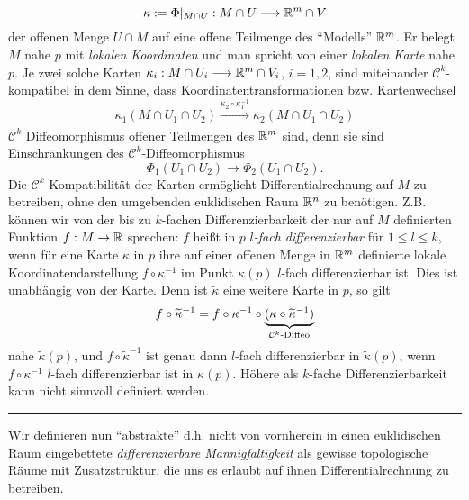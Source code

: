 \begin{equation} \label{karte}
\kappa:= \Phi|_{M\cap U}:M\cap U\longrightarrow \mathbb{R}^m \cap V
\end{equation}
der offenen Menge $U\cap M$  auf eine offene Teilmenge des ``Modells'' $\mathbb{R}^m$. Er belegt $M$ nahe $p$ mit \emph{lokalen Koordinaten} und man spricht von einer \emph{lokalen Karte} nahe $p$. \linebreak Je zwei solche Karten $\kappa_i:M\cap U_i \longrightarrow \mathbb{R}^m\cap V_i$, $i=1,2$, sind miteinander $\mathcal{C}^k$-kompatibel in dem Sinne, dass Koordinatentransformationen bzw. Kartenwechsel
$$\kappa_1(M\cap U_1\cap U_2) \xrightarrow[]{\kappa_2 \circ \kappa_1^{-1}}  \kappa_2 (M\cap U_1\cap U_2)$$
$\mathcal{C}^k$ Diffeomorphismus offener Teilmengen des $\mathbb{R}^m$ sind, denn sie sind Einschränkungen des $\mathcal{C}^k$-Diffeomorphismus $$\Phi_1(U_1\cap U_2)\to \Phi_2(U_1\cap U_2).$$ Die $\mathcal{C}^k$-Kompatibilität der Karten ermöglicht Differentialrechnung auf $M$ zu betreiben, ohne den umgebenden euklidischen Raum $\mathbb{R}^n$ zu benötigen. Z.B. können wir von der bis zu $k$-fachen Differenzierbarkeit der nur auf $M$ definierten Funktion $f:M\to \mathbb{R}$ sprechen: $f$ heißt in $p$ \emph{$l$-fach differenzierbar} für $1\leq l \leq k$, wenn für eine Karte $\kappa$ in $p$ ihre auf einer offenen Menge in $\mathbb{R}^m$ definierte lokale Koordinatendarstellung $f\circ \kappa^{-1}$  im Punkt $\kappa(p)$ $l$-fach differenzierbar ist. Dies ist unabhängig von der Karte. Denn ist $\widetilde{\kappa}$ eine weitere Karte in $p$, so gilt
$$ f \circ \widetilde{\kappa}^{-1} = f \circ \kappa^{-1} \circ \underbrace{(\kappa \circ \widetilde{\kappa}^{-1})}_{\mathcal{C}^k\text{-Diffeo}}$$
nahe $\widetilde{\kappa}(p)$, und $f\circ \widetilde{\kappa}^{-1}$ ist genau dann $l$-fach differenzierbar in $\widetilde{\kappa}(p)$, wenn $f\circ \kappa^{-1}$ $l$-fach differenzierbar ist in $\kappa(p)$. Höhere als $k$-fache Differenzierbarkeit kann nicht sinnvoll definiert werden.\\
\rule{\textwidth}{0.4pt}\vspace{0.2pc}
Wir definieren nun ``abstrakte'' d.h. nicht von vornherein in einen euklidischen Raum eingebettete \emph{differenzierbare Mannigfaltigkeit} als gewisse topologische Räume mit Zusatzstruktur, die uns es erlaubt auf ihnen Differentialrechnung zu betreiben.

